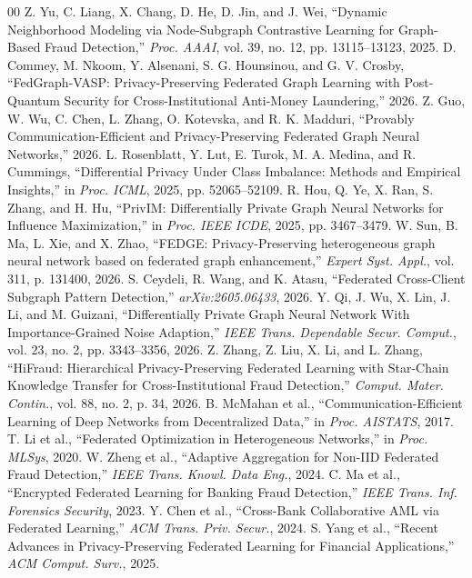 \documentclass[conference]{IEEEtran}
\begin{document}
\begin{thebibliography}{00}
 Z. Yu, C. Liang, X. Chang, D. He, D. Jin, and J. Wei, ``Dynamic Neighborhood Modeling via Node-Subgraph Contrastive Learning for Graph-Based Fraud Detection,'' \emph{Proc. AAAI}, vol. 39, no. 12, pp. 13115--13123, 2025.
 D. Commey, M. Nkoom, Y. Alsenani, S. G. Hounsinou, and G. V. Crosby, ``FedGraph-VASP: Privacy-Preserving Federated Graph Learning with Post-Quantum Security for Cross-Institutional Anti-Money Laundering,'' 2026.
 Z. Guo, W. Wu, C. Chen, L. Zhang, O. Kotevska, and R. K. Madduri, ``Provably Communication-Efficient and Privacy-Preserving Federated Graph Neural Networks,'' 2026.
 L. Rosenblatt, Y. Lut, E. Turok, M. A. Medina, and R. Cummings, ``Differential Privacy Under Class Imbalance: Methods and Empirical Insights,'' in \emph{Proc. ICML}, 2025, pp. 52065--52109.
 R. Hou, Q. Ye, X. Ran, S. Zhang, and H. Hu, ``PrivIM: Differentially Private Graph Neural Networks for Influence Maximization,'' in \emph{Proc. IEEE ICDE}, 2025, pp. 3467--3479.
 W. Sun, B. Ma, L. Xie, and X. Zhao, ``FEDGE: Privacy-Preserving heterogeneous graph neural network based on federated graph enhancement,'' \emph{Expert Syst. Appl.}, vol. 311, p. 131400, 2026.
 S. Ceydeli, R. Wang, and K. Atasu, ``Federated Cross-Client Subgraph Pattern Detection,'' \emph{arXiv:2605.06433}, 2026.
 Y. Qi, J. Wu, X. Lin, J. Li, and M. Guizani, ``Differentially Private Graph Neural Network With Importance-Grained Noise Adaption,'' \emph{IEEE Trans. Dependable Secur. Comput.}, vol. 23, no. 2, pp. 3343--3356, 2026.
 Z. Zhang, Z. Liu, X. Li, and L. Zhang, ``HiFraud: Hierarchical Privacy-Preserving Federated Learning with Star-Chain Knowledge Transfer for Cross-Institutional Fraud Detection,'' \emph{Comput. Mater. Contin.}, vol. 88, no. 2, p. 34, 2026.
 B. McMahan et al., ``Communication-Efficient Learning of Deep Networks from Decentralized Data,'' in \emph{Proc. AISTATS}, 2017.
 T. Li et al., ``Federated Optimization in Heterogeneous Networks,'' in \emph{Proc. MLSys}, 2020.
 W. Zheng et al., ``Adaptive Aggregation for Non-IID Federated Fraud Detection,'' \emph{IEEE Trans. Knowl. Data Eng.}, 2024.
 C. Ma et al., ``Encrypted Federated Learning for Banking Fraud Detection,'' \emph{IEEE Trans. Inf. Forensics Security}, 2023.
 Y. Chen et al., ``Cross-Bank Collaborative AML via Federated Learning,'' \emph{ACM Trans. Priv. Secur.}, 2024.
 S. Yang et al., ``Recent Advances in Privacy-Preserving Federated Learning for Financial Applications,'' \emph{ACM Comput. Surv.}, 2025.

\end{thebibliography}
\end{document}
